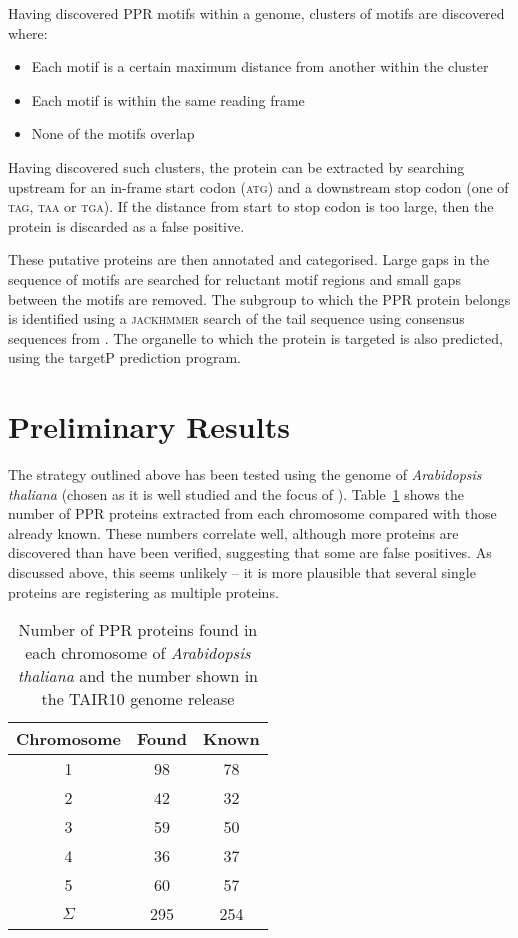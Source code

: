 \documentclass[twoside,a4paper]{article}
\begin{document}
\begin{multicols}{2}
Having discovered PPR motifs within a genome, clusters of motifs are discovered
where:
\begin{itemize}
  \item Each motif is a certain maximum distance from another within the
    cluster
  \item Each motif is within the same reading frame
  \item None of the motifs overlap
\end{itemize}
Having discovered such clusters, the protein can be extracted by searching
upstream for an in-frame start codon (\textsc{atg}) and a downstream stop codon
(one of \textsc{tag}, \textsc{taa} or \textsc{tga}).
If the distance from start to stop codon is too large, then the protein is
discarded as a false positive.

These putative proteins are then annotated and categorised.
Large gaps in the sequence of motifs are searched for reluctant motif regions
and small gaps between the motifs are removed.
The subgroup to which the PPR protein belongs is identified using a
\textsc{jackhmmer} search of the tail sequence using consensus sequences 
from \cite{Lurin2004}.
The organelle to which the protein is targeted is also predicted, using the
targetP prediction program.

\section{Preliminary Results}
\label{sec:results}

The strategy outlined above has been tested using the genome of 
\textit{Arabidopsis thaliana} (chosen as it is well studied and the focus of
\cite{Lurin2004}). 
Table~\ref{tab:CHR} shows the number of PPR proteins
extracted from each chromosome compared with those already known.
These numbers correlate well, although more proteins are discovered than have
been verified, suggesting that some are false positives.
As discussed above, this seems unlikely -- it is more plausible that several
single proteins are registering as multiple proteins.

\begin{table}[H]
  \centering
  \begin{tabular}{c|c|c}
    Chromosome & Found & Known \\
    \hline
    1 & 98 & 78 \\
    2 & 42 & 32 \\
    3 & 59 & 50 \\
    4 & 36 & 37 \\
    5 & 60 & 57 \\
    \hline
    $\Sigma$ & 295 & 254 \\
  \end{tabular}
  \caption{Number of PPR proteins found in each chromosome of 
    \textit{Arabidopsis thaliana} and the number shown in the TAIR10 genome
    release}
  \label{tab:CHR}
\end{table}


\end{multicols}
\end{document}
